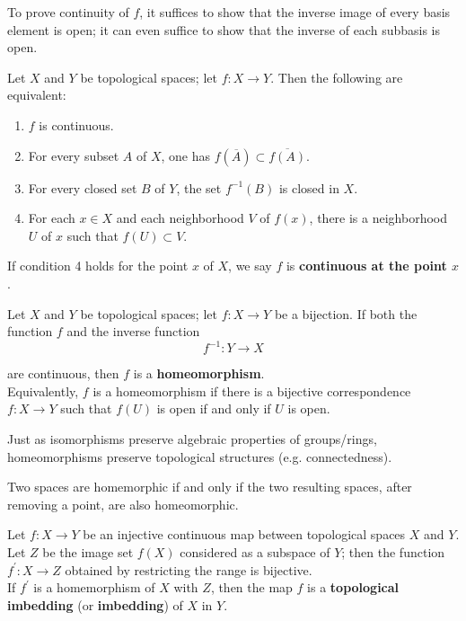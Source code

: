 \begin{remark}
To prove continuity of $f$, it suffices to show that the inverse image of every basis element is open; 
it can even suffice to show that the inverse of each subbasis is open.
\end{remark}

\begin{theorem}
Let $X$ and $Y$ be topological spaces; let $f \colon X \rightarrow Y$. Then the following are equivalent:
\begin{enumerate}
    \item $f$ is continuous.
    \item For every subset $A$ of $X$, one has $f(\overline{A}) \subset \overline{f(A)}$.
    \item For every closed set $B$ of $Y$, the set $f^{-1}(B)$ is closed in $X$.
    \item For each $x \in X$ and each neighborhood $V$ of $f(x)$, there is a neighborhood $U$ of $x$ such that $f(U) \subset V$. 
\end{enumerate}

If condition 4 holds for the point $x$ of $X$, we say $f$ is \textbf{continuous at the point $x$}.
\end{theorem}

\begin{definition}[Homeomorphism]
Let $X$ and $Y$ be topological spaces; let $f \colon X \rightarrow Y$ be a bijection. If both the function $f$ and the inverse function
\[
    f^{-1} \colon Y \rightarrow X
\]

are continuous, then $f$ is a \textbf{homeomorphism}. \\

Equivalently, $f$ is a homeomorphism if there is a bijective correspondence $f \colon X \rightarrow Y$ such that $f(U)$ is open if and only if $U$ is open.
\end{definition}

\begin{remark}
Just as isomorphisms preserve algebraic properties of groups/rings, homeomorphisms preserve topological structures (e.g. connectedness).
\end{remark}

\begin{remark}
Two spaces are homemorphic if and only if the two resulting spaces, after removing a point, are also homeomorphic.
\end{remark}

\begin{definition}[Imbedding]
Let $f \colon X \rightarrow Y$ be an injective continuous map between topological spaces $X$ and $Y$. Let $Z$ be the image set $f(X)$ considered as a subspace of $Y$;
then the function $f^{\prime} \colon X \rightarrow Z$ obtained by restricting the range is bijective. \\

If $f^{\prime}$ is a homemorphism of $X$ with $Z$, then the map $f$ is a \textbf{topological imbedding} (or \textbf{imbedding}) of $X$ in $Y$.
\end{definition}

